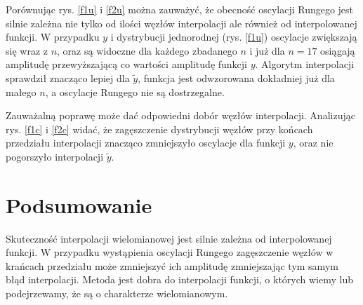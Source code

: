 \documentclass[11pt]{extarticle}
\begin{document}
	Porównując rys. \ref{f1u} i \ref{f2u} można zauważyć, że obecność oscylacji Rungego jest silnie zależna nie tylko od ilości węzłów interpolacji ale również od interpolowanej funkcji.
	W przypadku \(y\) i dystrybucji jednorodnej (rys. \ref{f1u}) oscylacje zwiększają się wraz z \(n\), oraz są widoczne dla każdego zbadanego \(n\) i już dla \(n=17\) osiągają amplitudę przewyższającą co wartości amplitudę funkcji \(y\).
	Algorytm interpolacji sprawdził znacząco lepiej dla \(\widetilde{y}\), funkcja jest odwzorowana dokładniej już dla małego \(n\), a oscylacje Rungego nie są dostrzegalne.

	Zauważalną poprawę może dać odpowiedni dobór węzłów interpolacji. Analizując rys. \ref{f1c} i \ref{f2c} widać, że zagęszczenie dystrybucji węzłów przy końcach przedziału interpolacji znacząco zmniejszyło oscylacje dla funkcji \(y\), oraz nie pogorszyło interpolacji \(\widetilde{y}\).

	\section{Podsumowanie}
	Skuteczność interpolacji wielomianowej jest silnie zależna od interpolowanej funkcji.
	W przypadku wystąpienia oscylacji Rungego zagęszczenie węzłów w krańcach przedziału może zmniejszyć ich amplitudę zmniejszając tym samym błąd interpolacji.
	Metoda jest dobra do interpolacji funkcji, o których wiemy lub podejrzewamy, że są o charakterze wielomianowym.
\end{document}
